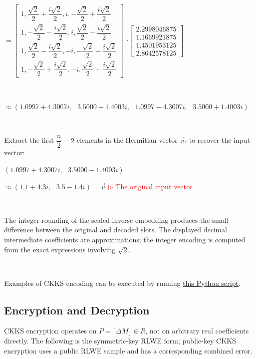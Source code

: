 $=
\begin{bmatrix}
1,\dfrac{\sqrt{2}}{2} + \dfrac{i\sqrt{2}}{2},i, -\dfrac{\sqrt{2}}{2} + \dfrac{i\sqrt{2}}{2}\\
1,-\dfrac{\sqrt{2}}{2} - \dfrac{i\sqrt{2}}{2}, i,\dfrac{\sqrt{2}}{2} - \dfrac{i\sqrt{2}}{2}\\
1,\dfrac{\sqrt{2}}{2} - \dfrac{i\sqrt{2}}{2}, -i, -\dfrac{\sqrt{2}}{2} - \dfrac{i\sqrt{2}}{2}\\
1,-\dfrac{\sqrt{2}}{2} + \dfrac{i\sqrt{2}}{2}, -i, \dfrac{\sqrt{2}}{2} + \dfrac{i\sqrt{2}}{2}
\end{bmatrix}$
$\cdot \begin{bmatrix}
2.2998046875\\1.1669921875\\1.4501953125\\2.8642578125
\end{bmatrix}$

$ $

$ \approx (1.0997+4.3007i, \text{ } 3.5000-1.4003i, \text{ } 1.0997-4.3007i, \text{ } 3.5000+1.4003i)$

$ $

Extract the first $\dfrac{n}{2} = 2$ elements in the Hermitian vector $\vec{v}_{'}$ to recover the input vector:

$(1.0997+4.3007i, \text{ } 3.5000-1.4003i)$

$\approx (1.1 + 4.3i, \text{ } 3.5 - 1.4i) = \vec{v}$ \textcolor{red}{  $\rhd$ The original input vector}

$ $

The integer rounding of the scaled inverse embedding produces the small difference between the original and decoded slots. The displayed decimal intermediate coefficients are approximations; the integer encoding is computed from the exact expressions involving $\sqrt2$.

$ $

 Examples of CKKS encoding can be executed by running \href{https://github.com/wang2000star/fhe-textbook-cn/blob/chinese-edition/source%20code/ckks.py}{\underline{this Python script}}.



\subsection{Encryption and Decryption}
\label{subsec:ckks-enc-dec}

CKKS encryption operates on $P=\lceil\Delta M\rfloor\in R$, not on arbitrary real coefficients directly. The following is the symmetric-key RLWE form; public-key CKKS encryption uses a public RLWE sample and has a corresponding combined error.

